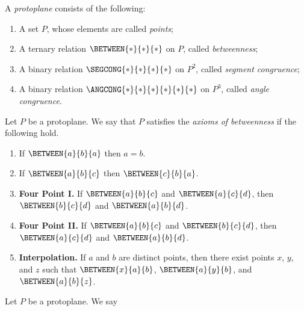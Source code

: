 \begin{dfn}[Protoplane]
A \emph{protoplane} consists of the following:
\begin{enumerate}
\item A set $P$, whose elements are called \emph{points};
\item A ternary relation $\BETWEEN{\ast}{\ast}{\ast}$ on $P$, called \emph{betweenness};
\item A binary relation $\SEGCONG{\ast}{\ast}{\ast}{\ast}$ on $P^2$, called \emph{segment congruence};
\item A binary relation $\ANGCONG{\ast}{\ast}{\ast}{\ast}{\ast}{\ast}$ on $P^3$, called \emph{angle congruence}.
\end{enumerate}
\end{dfn}


\begin{dfn}
Let $P$ be a protoplane. We say that $P$ satisfies the \emph{axioms of betweenness} if the following hold.
\begin{enumerate}
\item If $\BETWEEN{a}{b}{a}$ then $a = b$.
\item If $\BETWEEN{a}{b}{c}$ then $\BETWEEN{c}{b}{a}$.
\item \textbf{Four Point I.} If $\BETWEEN{a}{b}{c}$ and $\BETWEEN{a}{c}{d}$, then $\BETWEEN{b}{c}{d}$ and $\BETWEEN{a}{b}{d}$.
\item \textbf{Four Point II.} If $\BETWEEN{a}{b}{c}$ and $\BETWEEN{b}{c}{d}$, then $\BETWEEN{a}{c}{d}$ and $\BETWEEN{a}{b}{d}$.
\item \textbf{Interpolation.} If $a$ and $b$ are distinct points, then there exist points $x$, $y$, and $z$ such that $\BETWEEN{x}{a}{b}$, $\BETWEEN{a}{y}{b}$, and $\BETWEEN{a}{b}{z}$.
\end{enumerate}
\end{dfn}


\begin{dfn}
Let $P$ be a protoplane. We say
\end{dfn}
